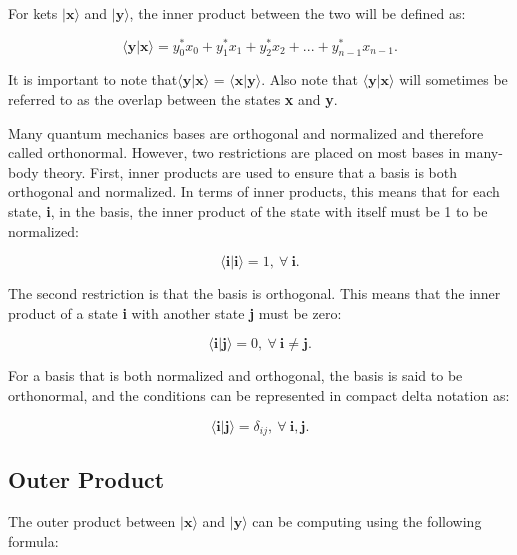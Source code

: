 For kets $| \textbf{x} \rangle$ and $| \textbf{y} \rangle$, the inner product between the two will be defined as:

\begin{equation}
    \langle \textbf{y} | \textbf{x} \rangle = y_0^*x_0 + y_1^*x_1 + y_2^*x_2 + ... + y_{n-1}^*x_{n-1}.
\end{equation}

It is important to note that$\langle \textbf{y} | \textbf{x} \rangle$ = $\langle \textbf{x} | \textbf{y} \rangle$.  Also note that $\langle \textbf{y} | \textbf{x} \rangle$ will sometimes be referred to as the overlap between the states \textbf{x} and \textbf{y}.


Many quantum mechanics bases are orthogonal and normalized and therefore called orthonormal. However, two restrictions are placed on most bases in many-body theory. First, inner products are used to ensure that a basis is both orthogonal and normalized. In terms of inner products, this means that for each state, \textbf{i}, in the basis, the inner product of the state with itself must be 1 to be normalized:

\begin{equation}
    \langle \textbf{i} | \textbf{i} \rangle = 1,\ \forall\ \textbf{i}.
\end{equation}

The second restriction is that the basis is orthogonal. This means that the inner product of a state \textbf{i} with another state \textbf{j} must be zero:

\begin{equation}
    \langle \textbf{i} | \textbf{j} \rangle = 0,\ \forall\ \textbf{i} \neq \textbf{j}.
\end{equation}

For a basis that is both normalized and orthogonal, the basis is said to be orthonormal, and the conditions can be represented in compact delta notation as:

\begin{equation}
    \langle \textbf{i} | \textbf{j} \rangle = \delta_{ij},\ \forall\ \textbf{i}, \textbf{j}.
\end{equation}

\subsection*{Outer Product}

The outer product between $|\textbf{x} \rangle$ and $|\textbf{y} \rangle$ can be computing using the following formula:

